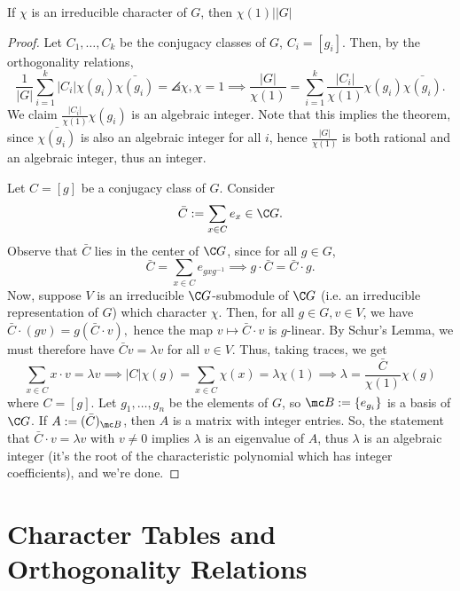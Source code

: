 \begin{thm}[][label=thm:algint]
    If $\chi$ is an irreducible character of $G$, then $\chi(1) \big \vert |G|$
\end{thm}

\begin{proof}
    Let $C_1,\dots,C_k$ be the conjugacy classes of $G$, $C_i=[g_i]$. Then, by the orthogonality relations,
    $$\frac{1}{|G|}\sum_{i=1}^k|C_i|\chi (g_i)\bar{\chi (g_i)}=\angles{\chi,\chi}=1 \implies \frac{|G|}{\chi(1)}=\sum_{i=1}^k\frac{|C_i|}{\chi(1)}\chi(g_i)\bar{\chi (g_i)}.$$
    We claim $\frac{|C_i|}{\chi(1)}\chi(g_i)$ is an algebraic integer. Note that this implies the theorem, since $\bar{\chi (g_i)}$ is also an algebraic integer for all $i$, hence $\frac{|G|}{\chi (1)}$ is both rational and an algebraic integer, thus an integer.

    Let $C =[g]$ be a conjugacy class of $G$. Consider
    $$\bar C:= \sum_{x \in C}e_x \in \C G.$$
    Observe that $\bar C$ lies in the center of $\C G$, since for all $g \in G$,
    $$\bar C = \sum_{x \in C}e_{gxg^{-1}}\implies  g \cdot \bar C=\bar C \cdot g.$$
    Now, suppose $V$ is an irreducible $\C G$-submodule of $\C G$ (i.e. an irreducible representation of $G$) which character $\chi$. Then, for all $g \in G, v \in V$, we have
    $\bar C \cdot (g v) = g ( \bar C \cdot v),$
    hence the map $v \mapsto \bar C \cdot v$ is $g$-linear. By Schur's Lemma, we must therefore have $\bar Cv = \lambda v$ for all $v \in V$. Thus, taking traces, we get
    $$\sum_{x \in C}x \cdot v = \lambda v \implies |C| \chi (g)=\sum_{x \in C}\chi (x)=\lambda \chi(1) \implies \lambda=\frac{\bar C}{\chi(1)}\chi(g)$$
    where $C=[g]$. Let $g_1,\dots,g_n$ be the elements of $G$, so $\mc B:=\{ e_{g_i}\}$ is a basis of $\C G$. If $A:= (\bar C)_{\mc B}$, then $A$ is a matrix with integer entries. So, the statement that $\bar C \cdot v = \lambda v$ with $v \neq 0$ implies $\lambda$ is an eigenvalue of $A$, thus $\lambda$ is an algebraic integer (it's the root of the characteristic polynomial which has integer coefficients), and we're done.
\end{proof}

\section{Character Tables and Orthogonality Relations}

